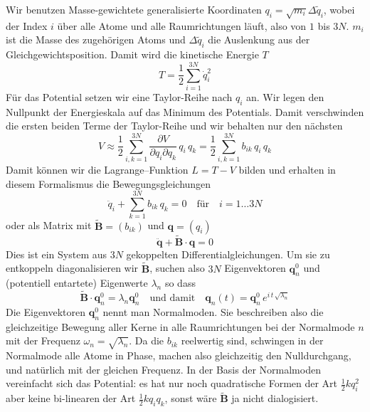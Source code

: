 Wir benutzen Masse-gewichtete generalisierte Koordinaten $q_i = \sqrt{m_i}  \Delta \tilde{q}_i$, wobei der Index $i$ über alle Atome und alle Raumrichtungen läuft, also von $1$ bis $3N$. $m_i$ ist die Masse des zugehörigen Atoms und 
$\Delta \tilde{q}_i$ die Auslenkung aus der Gleichgewichtsposition. Damit wird  die kinetische Energie $T$ 
\begin{equation}
T = \frac{1}{2} \sum_{i=1}^{3N} \dot{q}_i^2
\end{equation}
Für das Potential setzen wir eine Taylor-Reihe nach $q_i$ an. Wir legen den Nullpunkt der Energieskala auf das Minimum des Potentials. Damit verschwinden die ersten beiden Terme der Taylor-Reihe und wir behalten nur den nächsten
\begin{equation}
V \approx \frac{1}{2} \sum_{i,k = 1}^{3N} \frac{\partial V}{\partial q_i \partial q_k} \, q_i \, q_k = 
 \frac{1}{2} \sum_{i,k = 1}^{3N} b_{ik} \, q_i \, q_k 
\end{equation}
Damit können wir die Lagrange--Funktion $L = T - V$ bilden und erhalten in diesem Formalismus die Bewegungsgleichungen
\begin{equation}
 \ddot{q}_i + \sum_{k = 1}^{3N} b_{ik} \, q_k = 0 \quad \text{für} \quad i = 1 \dots 3N
\end{equation}
oder als Matrix mit $\tilde{\mathbf{B}} = (b_{ik})$ und $\mathbf{q} = (q_i)$
\begin{equation}
\ddot{\mathbf{q}} + \tilde{\mathbf{B}}  \cdot  \mathbf{q} = 0
\end{equation}
Dies ist ein System aus $3N$ gekoppelten Differentialgleichungen. Um sie zu entkoppeln diagonalisieren wir 
$\tilde{\mathbf{B}} $, suchen also $3N$ Eigenvektoren   $\mathbf{q}_n^0$ und (potentiell entartete) Eigenwerte $\lambda_n$ so dass
\begin{equation}
 \tilde{\mathbf{B}} \cdot \mathbf{q}_n^0 = \lambda_n \mathbf{q}_n^0 \quad \text{und damit} \quad
 \mathbf{q}_n(t) =  \mathbf{q}_n^0 \, e^{i \, t \, \sqrt{\lambda_n}}
\end{equation}
Die Eigenvektoren   $\mathbf{q}_n^0$ nennt man Normalmoden. Sie beschreiben also die gleichzeitige Bewegung aller Kerne in alle Raumrichtungen bei der Normal\-mode $n$ mit der Frequenz $\omega_n = \sqrt{\lambda_n}$. Da die $b_{ik}$ reelwertig sind, schwingen in der Normalmode alle Atome in Phase, machen also gleichzeitig den Nulldurchgang, und natürlich mit der gleichen Frequenz. In der Basis der Normalmoden vereinfacht sich das Potential: es hat nur noch quadratische Formen der Art $\frac{1}{2} k q_i^2$ aber keine bi-linearen der Art $\frac{1}{2} k q_i q_k$, sonst wäre $\tilde{\mathbf{B}} $ ja nicht dialogisiert.

